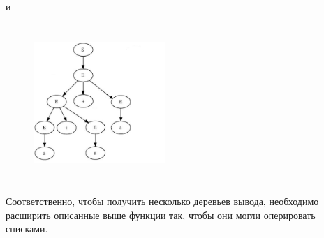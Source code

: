 и

\begin{figure}[h]
	\centering
		\includegraphics[width=5cm,height=6cm]{Pictures/div_tree2.jpeg}
	\label{fig:div_tree1}
\end{figure}
\clearpage
Соответственно, чтобы получить несколько деревьев вывода, необходимо расширить описанные выше функции так, чтобы они могли оперировать списками. 
 
 

